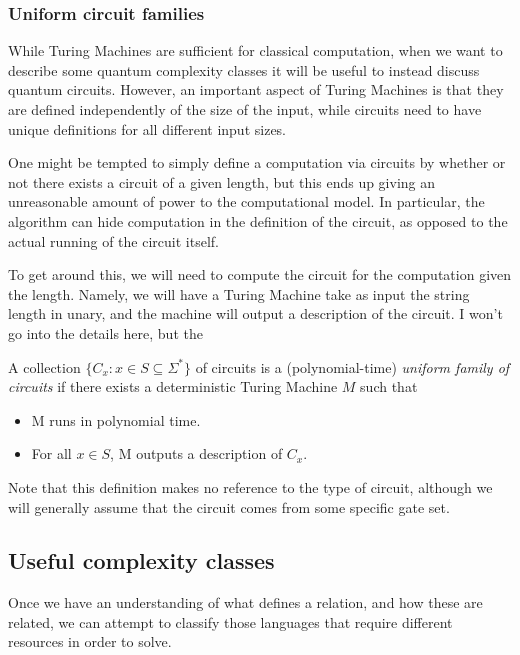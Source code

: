 \documentclass[../thesis-main/thesis-main]{subfiles}
\begin{document}
\subsubsection{Uniform circuit families}

While Turing Machines are sufficient for classical computation, when we want to describe some quantum complexity classes it will be useful to instead discuss quantum circuits.  However, an important aspect of Turing Machines is that they are defined independently of the size of the input, while circuits need to have unique definitions for all different input sizes.

One might be tempted to simply define a computation via circuits by whether or not there exists a circuit of a given length, but this ends up giving an unreasonable amount of power to the computational model.  In particular, the algorithm can hide computation in the definition of the circuit, as opposed to the actual running of the circuit itself.  

To get around this, we will need to compute the circuit for the computation given the length.  Namely, we will have a Turing Machine take as input the string length in unary, and the machine will output a description of the circuit.  I won't go into the details here, but the 

\begin{definition} A collection $\{C_x: x\in S\subseteq \Sigma^*\}$ of circuits is a (polynomial-time) \emph{uniform family of circuits} if there exists a deterministic Turing Machine $M$ such that 
\begin{itemize}
  \item M runs in polynomial time.
  \item For all $x\in S$, M outputs a description of $C_x$.
\end{itemize}
\end{definition}

Note that this definition makes no reference to the type of circuit, although we will generally assume that the circuit comes from some specific gate set.


\subsection{Useful complexity classes}

Once we have an understanding of what defines a relation, and how these are related, we can attempt to classify those languages that require different resources in order to solve.
\end{document}
